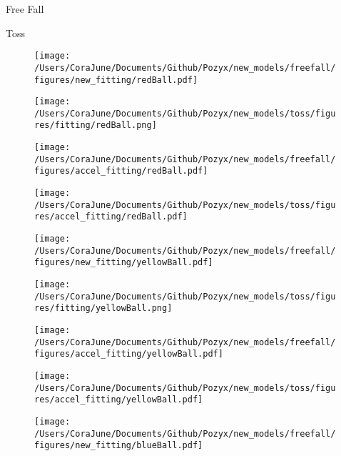 \documentclass[14pt]{article}
\begin{document}
\begin{centering}

\begin{multicols}{2}
\begin{description}
\item \Huge{Free Fall}
\item Toss
\end{description}
\end{multicols}

\begin{figure}[h!]
\begin{multicols}{2}
    \texttt{[image: /Users/CoraJune/Documents/Github/Pozyx/new\_models/freefall/figures/new\_fitting/redBall.pdf]}

    \texttt{[image: /Users/CoraJune/Documents/Github/Pozyx/new\_models/toss/figures/fitting/redBall.png]}
\end{multicols}

\begin{multicols}{2}
    \texttt{[image: /Users/CoraJune/Documents/Github/Pozyx/new\_models/freefall/figures/accel\_fitting/redBall.pdf]}

    \texttt{[image: /Users/CoraJune/Documents/Github/Pozyx/new\_models/toss/figures/accel\_fitting/redBall.pdf]}
\end{multicols}

\end{figure}

\begin{figure}
\begin{multicols}{2}
    \texttt{[image: /Users/CoraJune/Documents/Github/Pozyx/new\_models/freefall/figures/new\_fitting/yellowBall.pdf]}

    \texttt{[image: /Users/CoraJune/Documents/Github/Pozyx/new\_models/toss/figures/fitting/yellowBall.png]}
\end{multicols}

\begin{multicols}{2}
    \texttt{[image: /Users/CoraJune/Documents/Github/Pozyx/new\_models/freefall/figures/accel\_fitting/yellowBall.pdf]}

    \texttt{[image: /Users/CoraJune/Documents/Github/Pozyx/new\_models/toss/figures/accel\_fitting/yellowBall.pdf]}
\end{multicols}

\end{figure}

\begin{figure}
\begin{multicols}{2}
    \texttt{[image: /Users/CoraJune/Documents/Github/Pozyx/new\_models/freefall/figures/new\_fitting/blueBall.pdf]}


\end{multicols}
\end{figure}
\end{centering}
\end{document}
